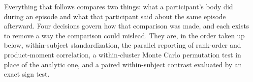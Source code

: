 
Everything that follows compares two things: what a participant's body did during an episode
and what that participant said about the same episode afterward. Four decisions govern how that
comparison was made, and each exists to remove a way the comparison could mislead. They are, in
the order taken up below, within-subject standardization, the parallel reporting of rank-order
and product-moment correlation, a within-cluster Monte Carlo permutation test in place of the analytic one,
and a paired within-subject contrast evaluated by an exact sign test.

